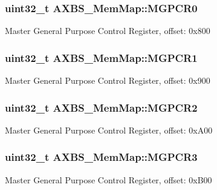 \subsubsection[{M\+G\+P\+C\+R0}]{\setlength{\rightskip}{0pt plus 5cm}uint32\+\_\+t A\+X\+B\+S\+\_\+\+Mem\+Map\+::\+M\+G\+P\+C\+R0}\label{struct_a_x_b_s___mem_map_a8e6ee199b9eb723478215926f9f3b6fe}
Master General Purpose Control Register, offset\+: 0x800 \hypertarget{struct_a_x_b_s___mem_map_a952d7f281eaf5fba221d0f1d3292f01b}{}
\subsubsection[{M\+G\+P\+C\+R1}]{\setlength{\rightskip}{0pt plus 5cm}uint32\+\_\+t A\+X\+B\+S\+\_\+\+Mem\+Map\+::\+M\+G\+P\+C\+R1}\label{struct_a_x_b_s___mem_map_a952d7f281eaf5fba221d0f1d3292f01b}
Master General Purpose Control Register, offset\+: 0x900 \hypertarget{struct_a_x_b_s___mem_map_a4bf70415762da6b4a4ef334878593d2f}{}
\subsubsection[{M\+G\+P\+C\+R2}]{\setlength{\rightskip}{0pt plus 5cm}uint32\+\_\+t A\+X\+B\+S\+\_\+\+Mem\+Map\+::\+M\+G\+P\+C\+R2}\label{struct_a_x_b_s___mem_map_a4bf70415762da6b4a4ef334878593d2f}
Master General Purpose Control Register, offset\+: 0x\+A00 \hypertarget{struct_a_x_b_s___mem_map_addcba8af91a2a00707fec89422083060}{}
\subsubsection[{M\+G\+P\+C\+R3}]{\setlength{\rightskip}{0pt plus 5cm}uint32\+\_\+t A\+X\+B\+S\+\_\+\+Mem\+Map\+::\+M\+G\+P\+C\+R3}\label{struct_a_x_b_s___mem_map_addcba8af91a2a00707fec89422083060}
Master General Purpose Control Register, offset\+: 0x\+B00 \hypertarget{struct_a_x_b_s___mem_map_aa612f4c47ff1bbd854bacda326b25aea}{}
